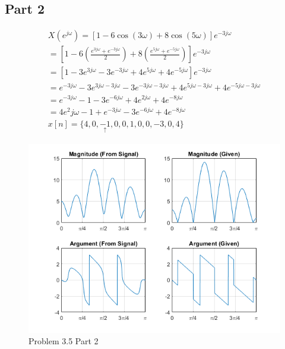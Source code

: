 \documentclass{article}
\begin{document}
\subsection*{Part 2}
\begin{gather*}
    X\left(e^{j\omega}\right) = \left[ 1 - 6\cos(3\omega) + 8\cos(5\omega) \right]e^{-3j\omega}\\
    = \left[1 - 6\left( \frac{e^{3j\omega} + e^{-3j\omega}}{2} \right) + 8\left(\frac{e^{5j\omega} + e^{-5j\omega}}{2}\right)\right] e^{-3j\omega}\\
    = \left[1 - 3e^{3j\omega} - 3e^{-3j\omega} + 4e^{5j\omega} + 4e^{-5j\omega}\right]e^{-3j\omega}\\
    = e^{-3j\omega} - 3e^{3j\omega - 3j\omega} - 3e^{-3j\omega - 3j\omega} + 4e^{5j\omega - 3j\omega} + 4e^{-5j\omega - 3j\omega}\\
    = e^{-3j\omega} - 1 - 3e^{-6j\omega} + 4e^{2j\omega} + 4e^{-8j\omega}\\
    = 4e^2j\omega - 1 + e^{-3j\omega} -3e^{-6j\omega} + 4e^{-8j\omega}\\
    x[n] = \{4, 0, \underset{\uparrow}{-1}, 0, 0, 1, 0, 0, -3, 0, 4\}
\end{gather*}
\begin{figure}[H]
    \centering
    \includegraphics[width=\textwidth]{html/Homework3_14.png}
    \caption{Problem 3.5 Part 2}
    \label{3.5.2}
\end{figure}
\end{document}
